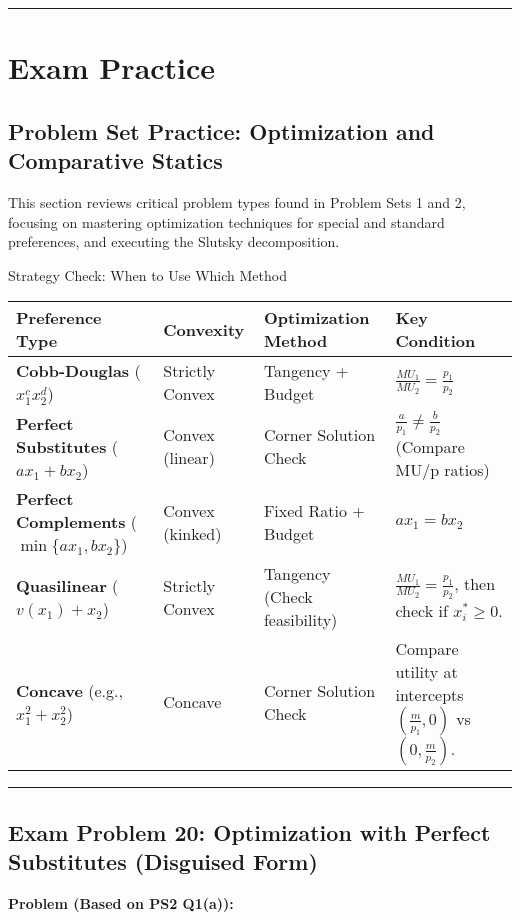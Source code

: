 \documentclass{article}
\begin{document}
\hrule

\section{Exam Practice}
\subsection{Problem Set Practice: Optimization and Comparative Statics}

This section reviews critical problem types found in Problem Sets 1 and 2, focusing on mastering optimization techniques for special and standard preferences, and executing the Slutsky decomposition.

Strategy Check: When to Use Which Method

\begin{center}
\begin{tabular}{llll}
\toprule
Preference Type & Convexity & Optimization Method & Key Condition \\
\midrule
\textbf{Cobb-Douglas} ($x_1^c x_2^d$) & Strictly Convex & Tangency + Budget & $\frac{MU_1}{MU_2} = \frac{p_1}{p_2}$ \\
\textbf{Perfect Substitutes} ($a x_1 + b x_2$) & Convex (linear) & Corner Solution Check & $\frac{a}{p_1} \neq \frac{b}{p_2}$ (Compare MU/p ratios) \\
\textbf{Perfect Complements} ($\min\{a x_1, b x_2\}$) & Convex (kinked) & Fixed Ratio + Budget & $a x_1 = b x_2$ \\
\textbf{Quasilinear} ($v(x_1) + x_2$) & Strictly Convex & Tangency (Check feasibility) & $\frac{MU_1}{MU_2} = \frac{p_1}{p_2}$, then check if $x_i^* \geq 0$. \\
\textbf{Concave} (e.g., $x_1^2+x_2^2$) & Concave & Corner Solution Check & Compare utility at intercepts $\left(\frac{m}{p_1}, 0\right)$ vs $\left(0, \frac{m}{p_2}\right)$. \\
\bottomrule
\end{tabular}
\end{center}

\bigskip\noindent\rule{\linewidth}{0.4pt}\bigskip

\subsection*{\textbf{Exam Problem 20: Optimization with Perfect Substitutes (Disguised Form)}}

\textbf{Problem (Based on PS2 Q1(a)):}
\end{document}
